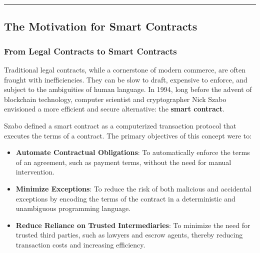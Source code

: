 \begin{center}\rule{0.5\linewidth}{0.5pt}\end{center}

\subsection{The Motivation for Smart
	Contracts}\label{section-1-the-motivation-for-smart-contracts}

\subsubsection{From Legal Contracts to Smart
	Contracts}\label{from-legal-contracts-to-smart-contracts}

Traditional legal contracts, while a cornerstone of modern commerce, are
often fraught with inefficiencies. They can be slow to draft, expensive
to enforce, and subject to the ambiguities of human language. In 1994,
long before the advent of blockchain technology, computer scientist and
cryptographer Nick Szabo envisioned a more efficient and secure
alternative: the \textbf{smart contract}.

Szabo defined a smart contract as a computerized transaction protocol
that executes the terms of a contract. The primary objectives of this
concept were to:

\begin{itemize}
	\tightlist
	\item
	\textbf{Automate Contractual Obligations}: To automatically enforce
	the terms of an agreement, such as payment terms, without the need for
	manual intervention.
	\item
	\textbf{Minimize Exceptions}: To reduce the risk of both malicious and
	accidental exceptions by encoding the terms of the contract in a
	deterministic and unambiguous programming language.
	\item
	\textbf{Reduce Reliance on Trusted Intermediaries}: To minimize the
	need for trusted third parties, such as lawyers and escrow agents,
	thereby reducing transaction costs and increasing efficiency.
\end{itemize}


